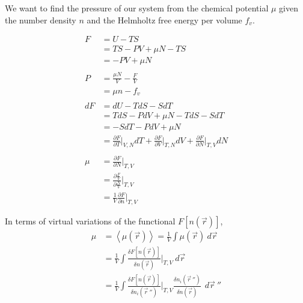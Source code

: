 \documentclass[double,12pt]{beavtex}
\begin{document}
We want to find the pressure of our system from the chemical potential 
$\mu$ given the number density $n$ and the Helmholtz free energy per 
volume $f_v$. 

\begin{align}
	F &= U - TS  \\
	  &= TS -PV + \mu N - TS  \\
	  &= -PV + \mu N  \\ \nonumber\\
%
	P &= \frac{\mu N}{V} - \frac{F}{V} \\
	  &= \mu n - f_v   \\ \nonumber\\
%
	dF &= dU - TdS -SdT \\
	   &= TdS - PdV + \mu N  - TdS -SdT\\
	   &=  -SdT - PdV + \mu N \\
	   &= \frac{\partial F}{\partial T}\bigg|_{V,N}dT 
	       + \frac{\partial F}{\partial V}\bigg|_{T,N}dV 
	       + \frac{\partial F}{\partial N}\bigg|_{T,V}dN \\ \nonumber\\
%
    \mu &= \frac{\partial F}{\partial N}\bigg|_{T,V} \\
        &= \frac{\partial \frac{F}{V}}{\partial \frac{N}{V}}\bigg|_{T,V}\\
        &= \frac{1}{V}\frac{\partial F}{\partial n}\bigg|_{T,V}        
\end{align}

In terms of virtual variations of the functional $F[n(\vec r)]$, 
\begin{align}
    \mu &= \left<\mu(\vec r)\right> = \frac{1}{V} \int \mu(\vec r)~d\vec r~    \\
        &= \frac{1}{V} \int \frac{\delta F[n(\vec r)]}{\delta n(\vec r)}
           \bigg|_{T,V}~d\vec r~  \\
        &= \frac{1}{V} \int \frac{\delta F[n(\vec r)]}{\delta n_i(\vec r~'')}
    \bigg|_{T,V} \frac{\delta n_i(\vec r~'')}{\delta n(\vec r)}~~d\vec r~''    
\end{align}
\end{document}
